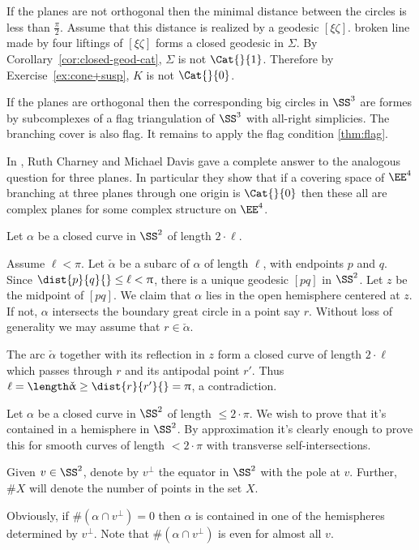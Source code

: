 If the planes are not orthogonal then the minimal distance between the circles is less than $\tfrac\pi2$.
Assume that this distance is realized by a geodesic $[\xi\zeta]$.
broken line made by four liftings of $[\xi\zeta]$ forms a closed geodesic in $\Sigma$. 
By Corollary~\ref{cor:closed-geod-cat}, $\Sigma$ is not $\Cat{}{1}$.
Therefore by Exercise~\ref{ex:cone+susp}, $K$ is not $\Cat{}{0}$.

If the planes are orthogonal then the corresponding big circles in $\SS^3$ are formes by subcomplexes of a flag triangulation of $\SS^3$ with all-right simplicies.
The branching cover is also flag.
It remains to apply the flag condition \ref{thm:flag}.

In \cite{charney-davis-93}, Ruth Charney and Michael Davis
gave a complete answer to the analogous question for three planes.
In particular they show that if a covering space of $\EE^4$
branching at three planes through one origin is $\Cat{}{0}$ then these all are complex planes for some complex structure on $\EE^4$.
\qeds

Let $\alpha$ be a closed curve in $\SS^2$ of length $2\cdot\ell$.

Assume $\ell<\pi$.
Let $\check\alpha$ be a subarc of $\alpha$ of length $\ell$, with endpoints $p$ and $q$. 
Since $\dist{p}{q}{}\le\ell<\pi$, there is a unique geodesic $[pq]$ in $\SS^2$.  
Let $z$ be the midpoint of  $[pq]$.  
We claim that $\alpha$ lies in the open hemisphere centered at $z$.  
If not, $\alpha$ intersects the boundary  great circle in a point say $r$.
Without loss of generality we may assume that $r\in\check\alpha$.

The arc $\check\alpha$ together with its reflection in $z$ form a closed curve of length $2\cdot \ell$ which passes through $r$ and its antipodal point $r'$.
Thus $\ell=\length \check\alpha\ge \dist{r}{r'}{}=\pi$, a contradiction.
\qeds

Let $\alpha$ be a closed curve in  $\SS^2$ of length $\le 2\cdot\pi$.  We wish to prove that it's contained in a hemisphere in $\SS^2$.
By approximation it's clearly enough to prove this for  smooth curves of length $< 2\cdot\pi$ with transverse self-intersections. 

Given $v\in \SS^2$, denote by $v^\perp$ the equator in $\SS^2$ with the pole at $v$.
Further, $\# X$ will denote the number of points in the set $X$.

Obviously,  if $\#(\alpha\cap v^\perp) =0$ then $\alpha$ is contained in one of the hemispheres determined by $v^\perp$. 
Note that $\#(\alpha\cap v^\perp)$ is even for almost all $v$.

